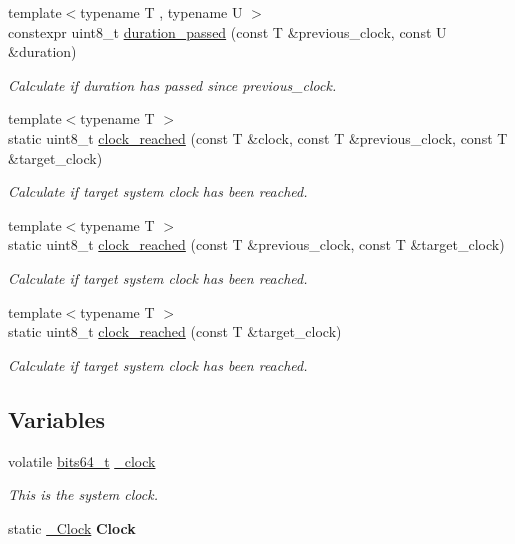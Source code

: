 \begin{DoxyCompactItemize}
{\footnotesize template$<$typename T , typename U $>$ }\\constexpr uint8\+\_\+t \hyperlink{namespaceclock_a4db26a90b5c001f2bb46af7a2069d63d}{duration\+\_\+passed} (const T \&previous\+\_\+clock, const U \&duration)
\begin{DoxyCompactList}\small\item\em Calculate if duration has passed since previous\+\_\+clock. \end{DoxyCompactList}\item 
{\footnotesize template$<$typename T $>$ }\\static uint8\+\_\+t \hyperlink{namespaceclock_a107ad02a77763be28bf63d43c566cf75}{clock\+\_\+reached} (const T \&clock, const T \&previous\+\_\+clock, const T \&target\+\_\+clock)
\begin{DoxyCompactList}\small\item\em Calculate if target system clock has been reached. \end{DoxyCompactList}\item 
{\footnotesize template$<$typename T $>$ }\\static uint8\+\_\+t \hyperlink{namespaceclock_aae7a34ec30a2420b2b51e717ab02c400}{clock\+\_\+reached} (const T \&previous\+\_\+clock, const T \&target\+\_\+clock)
\begin{DoxyCompactList}\small\item\em Calculate if target system clock has been reached. \end{DoxyCompactList}\item 
{\footnotesize template$<$typename T $>$ }\\static uint8\+\_\+t \hyperlink{namespaceclock_a240d81de9119f92701aa5f26555972c4}{clock\+\_\+reached} (const T \&target\+\_\+clock)
\begin{DoxyCompactList}\small\item\em Calculate if target system clock has been reached. \end{DoxyCompactList}\end{DoxyCompactItemize}
\subsection*{Variables}
\begin{DoxyCompactItemize}
\item 
volatile \hyperlink{unionbits64__s}{bits64\+\_\+t} \hyperlink{namespaceclock_a0cfce972d3684eddb3dd61bb0baaf225}{\+\_\+clock}
\begin{DoxyCompactList}\small\item\em This is the system clock. \end{DoxyCompactList}\item 
\hypertarget{namespaceclock_a8414359d2fd2b9f75143850c0e3bb4b5}{}\label{namespaceclock_a8414359d2fd2b9f75143850c0e3bb4b5} 
static \hyperlink{classclock_1_1__Clock}{\+\_\+\+Clock} {\bfseries Clock}
\end{DoxyCompactItemize}


